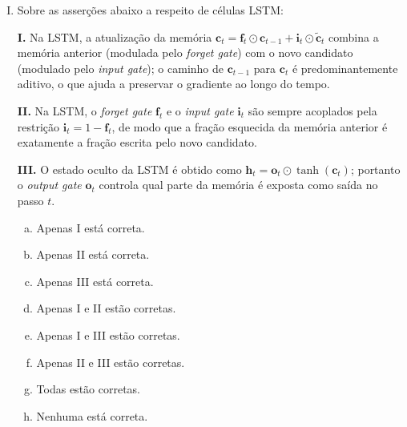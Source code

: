 \documentclass{dlproblemset}
\begin{document}
\begin{enumerate}[I)]
\textbf{IV.} A LSTM faz circular dois estados ao longo do tempo: o estado oculto $h_t$ e o estado de célula (memória) $c_t$, ao contrário da RNN \textit{vanilla}, que mantém apenas $h_t$.

\textbf{V.} Um modelo de linguagem determinístico e sempre correto pode atingir perplexidade inferior a $1$.

\begin{enumerate}[a)]
    \item Apenas II, III e IV estão corretas.
    \item Apenas I, II, IV e V estão corretas.
    \item Apenas I, II e IV estão corretas.
    \item Apenas I e IV estão corretas.
    \item Apenas I, II e V estão corretas.
    \item Apenas I, III e V estão corretas.
    \item Todas as afirmações estão corretas.
    \item Apenas II e IV estão corretas.
\end{enumerate}

\item Sobre as asserções abaixo a respeito de células LSTM:

\textbf{I.} Na LSTM, a atualização da memória $\mathbf{c}_t = \mathbf{f}_t \odot \mathbf{c}_{t-1} + \mathbf{i}_t \odot \tilde{\mathbf{c}}_t$ combina a memória anterior (modulada pelo \textit{forget gate}) com o novo candidato (modulado pelo \textit{input gate}); o caminho de $\mathbf{c}_{t-1}$ para $\mathbf{c}_t$ é predominantemente aditivo, o que ajuda a preservar o gradiente ao longo do tempo.

\textbf{II.} Na LSTM, o \textit{forget gate} $\mathbf{f}_t$ e o \textit{input gate} $\mathbf{i}_t$ são sempre acoplados pela restrição $\mathbf{i}_t = 1 - \mathbf{f}_t$, de modo que a fração esquecida da memória anterior é exatamente a fração escrita pelo novo candidato.

\textbf{III.} O estado oculto da LSTM é obtido como $\mathbf{h}_t = \mathbf{o}_t \odot \tanh(\mathbf{c}_t)$; portanto o \textit{output gate} $\mathbf{o}_t$ controla qual parte da memória é exposta como saída no passo $t$.

\begin{enumerate}[a)]
    \item Apenas I está correta.
    \item Apenas II está correta.
    \item Apenas III está correta.
    \item Apenas I e II estão corretas.
    \item Apenas I e III estão corretas.
    \item Apenas II e III estão corretas.
    \item Todas estão corretas.
    \item Nenhuma está correta.
\end{enumerate}


\end{enumerate}
\end{document}
